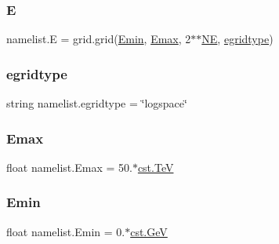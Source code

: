\mbox{\label{namespacenamelist_a732e08e1d7e605a46b2db15805f34db0}} 
\subsubsection{\texorpdfstring{E}{E}}
{\footnotesize\ttfamily namelist.\+E = grid.\+grid(\hyperlink{namespacenamelist_ad0f5eea37fb1092519d3ebfe3478ccc1}{Emin}, \hyperlink{namespacenamelist_a5262c7aab8333b9071ce73b63781ff32}{Emax}, 2$\ast$$\ast$\hyperlink{namespacenamelist_a372892989a797e9c3b759f023e878e4d}{NE}, \hyperlink{namespacenamelist_ae5aac93882db9b7885d5e7be1d4012e0}{egridtype})}

\mbox{\label{namespacenamelist_ae5aac93882db9b7885d5e7be1d4012e0}} 
\subsubsection{\texorpdfstring{egridtype}{egridtype}}
{\footnotesize\ttfamily string namelist.\+egridtype = \char`\"{}logspace\char`\"{}}

\mbox{\label{namespacenamelist_a5262c7aab8333b9071ce73b63781ff32}} 
\subsubsection{\texorpdfstring{Emax}{Emax}}
{\footnotesize\ttfamily float namelist.\+Emax = 50.$\ast$\hyperlink{constants_8h_a7f801e1f6821bc6baf0652ed2496e5e9}{cst.\+TeV}}

\mbox{\label{namespacenamelist_ad0f5eea37fb1092519d3ebfe3478ccc1}} 
\subsubsection{\texorpdfstring{Emin}{Emin}}
{\footnotesize\ttfamily float namelist.\+Emin = 0.$\ast$\hyperlink{constants_8h_aec0e126d9991db8ad0b26139f5860568}{cst.\+GeV}}

\mbox{\label{namespacenamelist_ae4a2b399bbe52993d2d43c55ac29e961}} 
